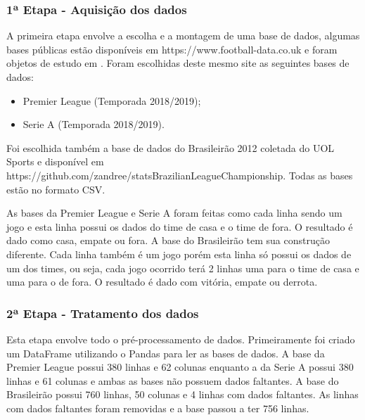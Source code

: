 \subsubsection{1ª Etapa - Aquisição dos dados}
	A primeira etapa envolve a escolha e a montagem de uma base de dados, algumas bases públicas estão disponíveis em https://www.football-data.co.uk e foram objetos de estudo em . Foram escolhidas deste mesmo site as seguintes bases de dados:
	\begin{itemize}
	\item Premier League (Temporada 2018/2019);
	\item Serie A (Temporada 2018/2019).
	\end{itemize}
	
	Foi escolhida também a base de dados do Brasileirão 2012 coletada do UOL Sports e disponível em https://github.com/zandree/statsBrazilianLeagueChampionship. Todas as bases estão no formato CSV.
	
	As bases da Premier League e Serie A foram feitas como cada linha sendo um jogo e esta linha possui os dados do time de casa e o time de fora. O resultado é dado como casa, empate ou fora. A base do Brasileirão tem sua construção diferente. Cada linha também é um jogo porém esta linha só possui os dados de um dos times, ou seja, cada jogo ocorrido terá 2 linhas uma para o time de casa e uma para o de fora. O resultado é dado com vitória, empate ou derrota.
	

\subsubsection{2ª Etapa - Tratamento dos dados}
	Esta etapa envolve todo o pré-processamento de dados. Primeiramente foi criado um DataFrame utilizando o Pandas para ler as bases de dados. A base da Premier League possui 380 linhas e 62 colunas enquanto a da Serie A possui 380 linhas e 61 colunas e ambas as bases não possuem dados faltantes. A base do Brasileirão possui 760 linhas, 50 colunas e 4 linhas com dados faltantes. As linhas com dados faltantes foram removidas e a base passou a ter 756 linhas.
	
